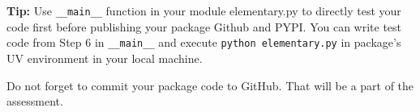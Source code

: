 \documentclass[12pt, xcolor=dvipsnames,svgnames,x11names]{article}
\begin{document}
\textbf{Tip:} Use \texttt{\_\_main\_\_} function in your module {elementary.py} to directly test your code first before publishing your package Github and PYPI. You can write test code from Step 6 in \texttt{\_\_main\_\_} and execute \texttt{python elementary.py} in package's UV environment in your local machine.

Do not forget to commit your package code to GitHub. That will be a part of the assessment.
\end{document}
